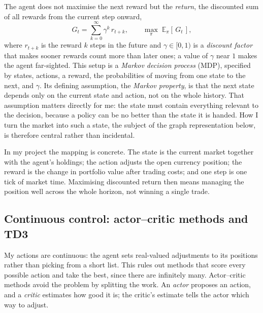 \documentclass[12pt,a4paper]{article}
\begin{document}
The agent does not maximise the next reward but the \emph{return}, the discounted sum of all
rewards from the current step onward,
\begin{equation}
G_t=\sum_{k=0}^{\infty}\gamma^{k}\,r_{t+k},\qquad \max_{\pi}\;\mathbb{E}_{\pi}[\,G_t\,],
\label{eq:return}
\end{equation}
where $r_{t+k}$ is the reward $k$ steps in the future and $\gamma\in[0,1)$ is a \emph{discount
factor} that makes sooner rewards count more than later ones; a value of $\gamma$ near $1$
makes the agent far-sighted. This setup is a \emph{Markov decision process} (MDP), specified
by states, actions, a reward, the probabilities of moving from one state to the next, and
$\gamma$. Its defining assumption, the \emph{Markov property}, is that the next state depends
only on the current state and action, not on the whole history. That assumption matters
directly for me: the state must contain everything relevant to the decision, because a policy
can be no better than the state it is handed. How I turn the market into such a state, the
subject of the graph representation below, is therefore central rather than incidental.

In my project the mapping is concrete. The state is the current market together with the
agent's holdings; the action adjusts the open currency position; the reward is the change in
portfolio value after trading costs; and one step is one tick of market time. Maximising
discounted return then means managing the position well across the whole horizon, not winning
a single trade.

\subsection{Continuous control: actor--critic methods and TD3}
\label{sub:td3}

My actions are continuous: the agent sets real-valued adjustments to its positions rather
than picking from a short list. This rules out methods that score every possible action and
take the best, since there are infinitely many. Actor--critic methods avoid the problem by
splitting the work. An \emph{actor} proposes an action, and a \emph{critic} estimates how good
it is; the critic's estimate tells the actor which way to adjust.
\end{document}
